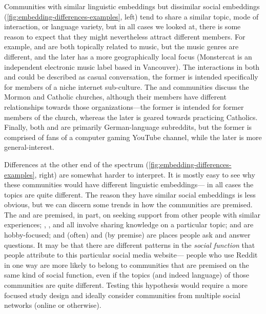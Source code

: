 \documentclass[11pt]{article}
\begin{document}
Communities with similar linguistic embeddings but dissimilar social embeddings
(\cref{fig:embedding-differences-examples}, left) tend to share a similar
topic, mode of interaction, or language variety, but 
in all cases we looked at, there is some reason to expect that
they might nevertheless attract different members.
For example,
 and  are both topically
related to music, but the music genres are different, and the later
has a more geographically local focus (Monstercat is an independent
electronic music label based in Vancouver). The interactions in both 
 and  
could be described as casual conversation, the former is intended specifically for
members of a niche internet sub-culture. %
The  and  communities discuss
the Mormon and Catholic churches, although their members have different 
relationships towards those organizations---the former is intended for
former members of the church, whereas the later is geared towards practicing
Catholics.
Finally, both  and  are primarily
German-language subreddits, but the former is comprised of fans of a
computer gaming YouTube channel, while the later is more
general-interest.

Differences at the other end of the spectrum
(\cref{fig:embedding-differences-examples}, right) are somewhat harder
to interpret.  It is mostly easy to see why these communities would
have different linguistic embeddings---%
in all cases the topics are quite different.  The reason they have
similar social embeddings is less obvious, but we can discern some
trends in how the communities are premised.  The
 and  are premised,
in part, on seeking support from other people with similar
experiences; , , and
 all involve sharing knowledge on a particular topic;
 and  are hobby-focused; and
 (often) and  (by premise) are
places people ask and answer questions.  It may be that there are
different patterns in the \emph{social function} that people attribute
to this particular social media website---%
people who use Reddit in one way are more likely to belong to
communities that are premised on the same kind of social function,
even if the topics (and indeed language) of those communities are
quite different.  Testing this hypothesis would require a more focused
study design and ideally consider communities from multiple social
networks (online or otherwise).
\end{document}
